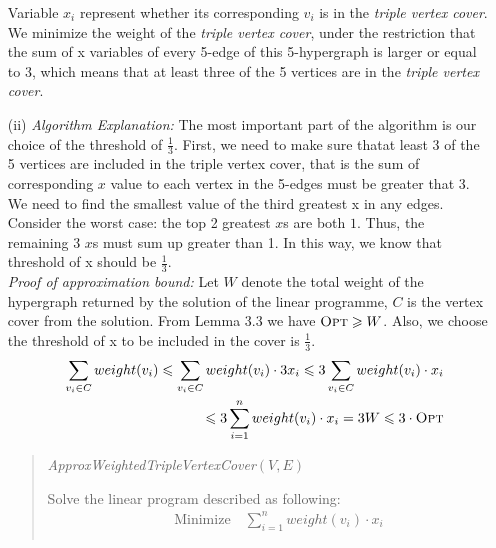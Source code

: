 \documentclass{article}
\renewcommand{\leq}{\leqslant}
\renewcommand{\geq}{\geqslant}
\newcounter{rcounter}
\newenvironment{rlist}%
{\begin{list}{\setnr-\arabic{rcounter}}{\usecounter{rcounter}}}{\end{list}}
\begin{document}
\begin{rlist}
\begin{enumerate}
            Variable $x_i$ represent whether its corresponding $v_i$ is in the \textit{triple vertex cover}. 
            We minimize the weight of the \textit{triple vertex cover}, under the restriction that the sum 
            of x variables of every 5-edge of this 5-hypergraph is larger or equal to 3, which means that 
            at least three of the 5 vertices are in the \textit{triple vertex cover}. 
            \item[(ii)] \textit{Algorithm Explanation:} The most important part of the algorithm is our choice of the threshold of $\frac{1}{3}$. First, 
            we need to make sure thatat least 3 of the 5 vertices are included in the triple vertex cover, that is the sum of corresponding $x$ value to 
            each vertex in the 5-edges must be greater that 3. We need to find the smallest value of the third greatest x in any edges. Consider the 
            worst case: the top 2 greatest $x$s are both $1$. Thus, the remaining 3 $x$s must sum up greater than 1. In this way, we know that threshold 
            of x should be $\frac{1}{3}$.\\
            \textit{Proof of approximation bound:} Let $W$ denote the total weight of the hypergraph returned by the solution of the linear programme, 
            $C$ is the vertex cover from the solution. From Lemma 3.3 we have $\textrm{\sc Opt} \geq W$. Also, we choose the threshold of x to be included in 
            the cover is $\frac{1}{3}$.
            \begin{eqnarray*}
            &&\sum_{v_i\in C} weight(v_i) \leq \sum_{v_i\in C} weight(v_i) \cdot 3x_i \leq 3 \sum_{v_i\in C} weight(v_i) \cdot x_i \\
            && \leq 3\sum_{i=1}^{n} weight(v_i) \cdot x_i = 3W \leq 3 \cdot \textrm{\sc Opt}
            \end{eqnarray*}
            \begin{algorithm}
                \vspace*{2mm}
                \begin{quotation}
                    \noindent
                    \emph{ApproxWeightedTripleVertexCover}$(V,E)$
                    \begin{algorithmic}[1]
                        \State Solve the linear program described as following:
                        \begin{eqnarray*}
                            && \textrm{Minimize} \quad \sum_{i=1}^{n}weight(v_i) \cdot x_i \\

\end{eqnarray*}
\end{algorithmic}
\end{quotation}
\end{algorithm}
\end{enumerate}
\end{rlist}
\end{document}
